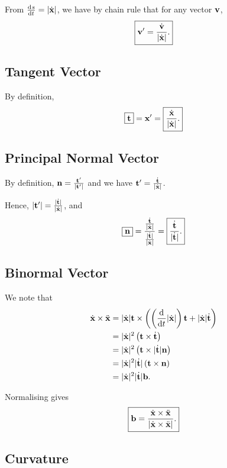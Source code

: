 \documentclass{article}
\theoremstyle{definition}
\theoremstyle{remark}
\DeclarePairedDelimiter{\abs}{\lvert}{\rvert}
\newcommand{\flatfrac}[2]{\frac{#1}{#2}}
\newcommand{\cross}{\times}
\begin{document}
From \(\dv*{s}{t} = \abs{\dot{\vb{x}}}\), we have by chain rule that for any vector \(\vb{v}\),
\[
    \boxed{\vb{v}' = \frac{\dot{\vb{v}}}{\abs{\dot{\vb{x}}}}.}
\]

\subsection*{Tangent Vector}

By definition,
\[
    \boxed{\vb{t}} = \vb{x}' = \boxed{\frac{\dot{\vb{x}}}{\abs{\dot{\vb{x}}}}.}
\]

\subsection*{Principal Normal Vector}

By definition, \(\vb{n} = \flatfrac{\vb{t}'}{\abs{\vb{t}'}}\) and we have \(\vb{t}' = \flatfrac{\dot{\vb{t}}}{\abs{\dot{\vb{x}}}}\).

Hence, \(\abs{\vb{t}'} = \flatfrac{\abs{\dot{\vb{t}}}}{\abs{\dot{\vb{x}}}}\), and
\[
    \boxed{\vb{n}} = \frac{\flatfrac{\dot{\vb{t}}}{\abs{\dot{\vb{x}}}}}{\flatfrac{\abs{\dot{\vb{t}}}}{\abs{\dot{\vb{x}}}}} = \boxed{\frac{\dot{\vb{t}}}{\abs{\dot{\vb{t}}}}.}
\]

\subsection*{Binormal Vector}

We note that
\begin{align*}
    \dot{\vb{x}} \cross \ddot{\vb{x}} &= \abs{\dot{\vb{x}}} \vb{t} \cross \pqty{\pqty{\dv{t} \abs{\dot{\vb{x}}}} \vb{t} + \abs{\dot{\vb{x}}} \dot{\vb{t}}} \\
    &= \abs{\dot{\vb{x}}}^2 \pqty{\vb{t} \cross \dot{\vb{t}}} \\
    &= \abs{\dot{\vb{x}}}^2 \pqty{\vb{t} \cross \abs{\dot{\vb{t}}} \vb{n}} \\
    &= \abs{\dot{\vb{x}}}^2 \abs{\dot{\vb{t}}} \pqty{\vb{t} \cross \vb{n}} \\
    &= \abs{\dot{\vb{x}}}^2 \abs{\dot{\vb{t}}} \vb{b}.
\end{align*}

Normalising gives
\[
    \boxed{\vb{b} = \frac{\dot{\vb{x}} \cross \ddot{\vb{x}}}{\abs{\dot{\vb{x}} \cross \ddot{\vb{x}}}}.}
\]

\subsection*{Curvature}
\end{document}
